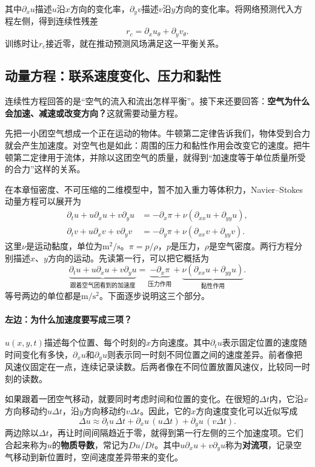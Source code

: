 其中$\partial_xu$描述$u$沿$x$方向的变化率，$\partial_yv$描述$v$沿$y$方向的变化率。将网络预测代入方程左侧，得到连续性残差
\[
 r_c=\partial_xu_\theta+\partial_yv_\theta.
\]
训练时让$r_c$接近零，就在推动预测风场满足这一平衡关系。

\subsection{动量方程：联系速度变化、压力和黏性}
连续性方程回答的是“空气的流入和流出怎样平衡”。接下来还要回答：\textbf{空气为什么会加速、减速或改变方向？}这就需要动量方程。

先把一小团空气想成一个正在运动的物体。牛顿第二定律告诉我们，物体受到合力就会产生加速度。对空气也是如此：周围的压力和黏性作用会改变它的速度。把牛顿第二定律用于流体，并除以这团空气的质量，就得到“加速度等于单位质量所受的合力”这样的关系。

在本章恒密度、不可压缩的二维模型中，暂不加入重力等体积力，Navier--Stokes 动量方程可以展开为
\begin{align}
 \partial_tu+u\partial_xu+v\partial_yu
 &=-\partial_x\pi+\nu(\partial_{xx}u+\partial_{yy}u),\\
 \partial_tv+u\partial_xv+v\partial_yv
 &=-\partial_y\pi+\nu(\partial_{xx}v+\partial_{yy}v).
 \label{eq:pinn-momentum}
\end{align}
这里$\nu$是运动黏度，单位为$\mathrm{m^2/s}$。$\pi=p/\rho$，$p$是压力，$\rho$是空气密度。两行方程分别描述$x$、$y$方向的运动。先读第一行，可以把它概括为
\[
 \underbrace{\partial_tu+u\partial_xu+v\partial_yu}_{\text{跟着空气团看到的加速度}}
 =\underbrace{-\partial_x\pi}_{\text{压力作用}}
 +\underbrace{\nu(\partial_{xx}u+\partial_{yy}u)}_{\text{黏性作用}}.
\]
等号两边的单位都是$\mathrm{m/s^2}$。下面逐步说明这三个部分。

\paragraph{左边：为什么加速度要写成三项？}
$u(x,y,t)$描述每个位置、每个时刻的$x$方向速度。其中$\partial_tu$表示固定位置的速度随时间变化有多快，$\partial_xu$和$\partial_yu$则表示同一时刻不同位置之间的速度差异。前者像把风速仪固定在一点，连续记录读数。后两者像在不同位置放置风速仪，比较同一时刻的读数。

如果跟着一团空气移动，就要同时考虑时间和位置的变化。在很短的$\Delta t$内，它沿$x$方向移动约$u\Delta t$，沿$y$方向移动约$v\Delta t$。因此，它的$x$方向速度变化可以近似写成
\[
 \Delta u\approx\partial_tu\,\Delta t
 +\partial_xu\,(u\Delta t)+\partial_yu\,(v\Delta t).
\]
两边除以$\Delta t$，再让时间间隔趋近于零，就得到第一行左侧的三个加速度项。它们合起来称为$u$的\textbf{物质导数}，常记为$Du/Dt$。其中$u\partial_xu+v\partial_yu$称为\textbf{对流项}，记录空气移动到新位置时，空间速度差异带来的变化。

